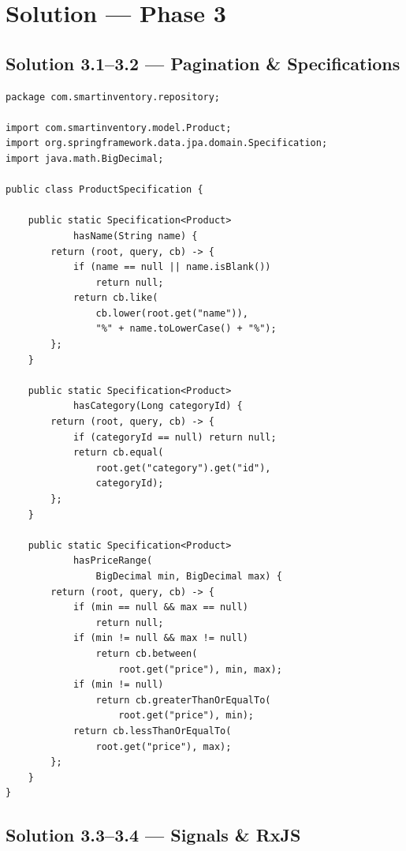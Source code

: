 \documentclass[12pt,a4paper]{report}
\begin{document}
\chapter{Solution --- Phase 3}

\section{Solution 3.1--3.2 --- Pagination \& Specifications}

\begin{lstlisting}[style=javastyle, title={repository/ProductSpecification.java}]
package com.smartinventory.repository;

import com.smartinventory.model.Product;
import org.springframework.data.jpa.domain.Specification;
import java.math.BigDecimal;

public class ProductSpecification {

    public static Specification<Product>
            hasName(String name) {
        return (root, query, cb) -> {
            if (name == null || name.isBlank())
                return null;
            return cb.like(
                cb.lower(root.get("name")),
                "%" + name.toLowerCase() + "%");
        };
    }

    public static Specification<Product>
            hasCategory(Long categoryId) {
        return (root, query, cb) -> {
            if (categoryId == null) return null;
            return cb.equal(
                root.get("category").get("id"),
                categoryId);
        };
    }

    public static Specification<Product>
            hasPriceRange(
                BigDecimal min, BigDecimal max) {
        return (root, query, cb) -> {
            if (min == null && max == null)
                return null;
            if (min != null && max != null)
                return cb.between(
                    root.get("price"), min, max);
            if (min != null)
                return cb.greaterThanOrEqualTo(
                    root.get("price"), min);
            return cb.lessThanOrEqualTo(
                root.get("price"), max);
        };
    }
}
\end{lstlisting}

\section{Solution 3.3--3.4 --- Signals \& RxJS}
\end{document}
